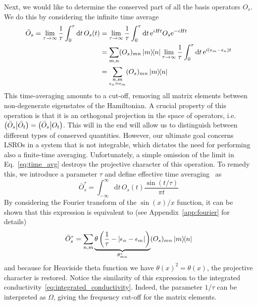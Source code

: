 Next, we would like to determine the conserved part of all the basis operators \(O_s\). We do this
by considering the infinite time average 
\begin{align}
    \bar{O}_s = \lim_{\tau\to\infty}\frac{1}{\tau} \int_0^{\tau} \mathrm{d}t\, O_s(t) &= 
     \lim_{\tau\to\infty}\frac{1}{\tau} \int_0^{\tau} \mathrm{d}t\, \mathrm{e}^{i H t}O_s \mathrm{e}^{-i H t} \nonumber\\
     &= \sum_{m,n} (O_s)_{mn}\ketbra{m}{n} \lim_{\tau\to\infty} \frac{1}{\tau} \int_0^{\tau} \mathrm{d}t \, \mathrm{e}^{i(\epsilon_m-\epsilon_n)t} \nonumber\\
    &= \sum_{\substack{n,m \\ \epsilon_n = \epsilon_m}} (O_s)_{mn}\ketbra{m}{n}
    \label{eq:time_avg}
\end{align}
This time-averaging amounts to a cut-off, removing all matrix elements between non-degenerate eigenstates
of the Hamiltonian. A crucial property of this operation is that it is an orthogonal projection
in the space of operators, i.e. \(\left(\bar{O}_s \middle| \bar{O}_t\right) = \left(\bar{O}_s \middle| O_t\right)\). This will
in the end will allow us to distinguish between different types of conserved quantities.
However, our ultimate goal concerns LSROs in a system that is not integrable, which dictates the
need for performing also a finite-time averaging. Unfortunately, a simple omission of the limit
in Eq.~\eqref{eq:time_avg} destroys the projective character of this operation. To remedy this,
we introduce a parameter \(\tau\) and define effective time averaging~\autocite{Mierzejewski2015}
as
\begin{equation}
    \bar{O}_s^{\tau} = \int_{-\infty}^{\infty} \mathrm{d}t\, O_s(t) \frac{\sin(t/\tau)}{\pi t}
\end{equation}
By considering the Fourier transform of the \(\sin(x)/x\) function, it can be shown that
this expression is equivalent to (see Appendix~\ref{app:fourier} for details)
\begin{equation}
    \bar{O}_s^{\tau} = \sum_{n,m} \underbrace{\theta\left(\frac{1}{\tau} - |\epsilon_n - \epsilon_m|\right)}_{\theta_{mn}^{\tau}} (O_s)_{mn} \ketbra{m}{n}
\label{eq:finite_time_avg}
\end{equation}
and because for Heaviside theta function we have \(\theta(x)^2 = \theta(x)\), the projective character is restored. Notice the similarity
of this expression to the integrated conductivity~\eqref{eq:integrated_conductivity}. Indeed, the 
parameter \(1/\tau\) can be interpreted as \(\Omega\), giving the frequency cut-off for the matrix elements.
